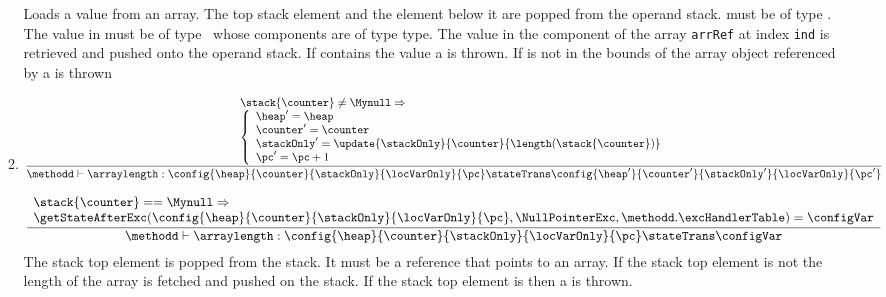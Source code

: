 \begin{itemize}
\begin{enumerate}
	       
	 

               Loads a value from an array. The top stack element \stack{\topStack} and the element below it 
	       are popped from the operand stack.  \stack{\topStack} must be of type \Myint. The value in  must be 
               of type  \ whose components are of type \textrm{type}. The value in the component of the array  \texttt{arrRef} 
	       at index \texttt{ind} is retrieved and pushed onto the operand stack.
	       If  contains the value \Mynull a \NullPointerExc is thrown. If \stack{\topStack}  is
	       not in the bounds of the array object referenced by   a \ArrIndexOutOfBoundExc is thrown


    \item \arraylength
          $$\frac{ \begin{array}{l}
			   \stack{ \counter } \neq \Mynull \Rightarrow \\
			    \left\{\begin{array}{l}
			          \heap' = \heap \\ 
				  \counter'= \counter \\
				  \stackOnly'= \update{\stackOnly}{\counter}{ \length( {\stack{\counter} } )  } \\ 
				  \pc' = \pc+ 1
                           \end{array}\right.      
		    \end{array}
	        }
	        {\methodd \vdash \arraylength :  \config{\heap}{\counter}{\stackOnly}{\locVarOnly}{\pc} 
		                  \stateTrans  
				  \config{\heap'}{\counter'}{\stackOnly'}{\locVarOnly}{\pc'} }  $$
		     
	 

	  $$ 	 \frac{ \begin{array}{l}
			       \stack{ \counter } == \Mynull \Rightarrow  \\
			        \getStateAfterExc( \config{\heap}{\counter}{\stackOnly}{\locVarOnly}{\pc}, \NullPointerExc ,\methodd.\excHandlerTable ) =  \configVar  
			\end{array}
		      }
		      {\methodd \vdash \arraylength : \config{\heap}{\counter}{\stackOnly}{\locVarOnly}{\pc} 
		                                      \stateTrans  
						      \configVar}  $$
	The stack top element is popped from the stack. It must be a 
	reference that points to an array. If the stack top element \stack{\counter} is not \Mynull  the length of the array  
	\length{\stack{\counter} } is fetched and pushed on the stack.
	If the stack top element \stack{\counter} is \Mynull then a \NullPointerExc is thrown.



\end{enumerate}
\end{itemize}
